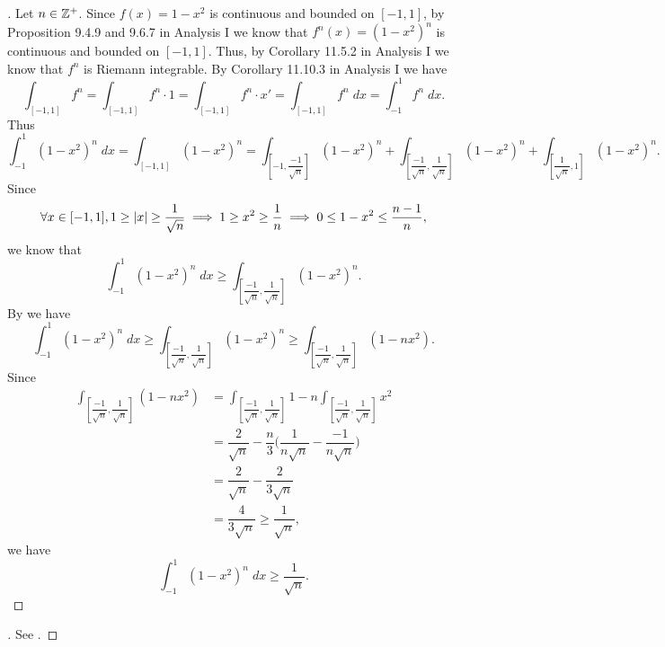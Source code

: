 \begin{proof}[]
  Let \(n \in \mathbb{Z}^+\).
  Since \(f(x) = 1 - x^2\) is continuous and bounded on \([-1, 1]\), by Proposition 9.4.9 and 9.6.7 in Analysis I we know that \(f^n(x) = (1 - x^2)^n\) is continuous and bounded on \([-1, 1]\).
  Thus, by Corollary 11.5.2 in Analysis I we know that \(f^n\) is Riemann integrable.
  By Corollary 11.10.3 in Analysis I we have
  \[
    \int_{[-1, 1]} f^n = \int_{[-1, 1]} f^n \cdot 1 = \int_{[-1, 1]} f^n \cdot x' = \int_{[-1, 1]} f^n \; dx = \int_{-1}^1 f^n \; dx.
  \]
  Thus
  \[
    \int_{-1}^1 (1 - x^2)^n \; dx = \int_{[-1, 1]} (1 - x^2)^n = \int_{[-1, \dfrac{-1}{\sqrt{n}}]} (1 - x^2)^n + \int_{[\dfrac{-1}{\sqrt{n}}, \dfrac{1}{\sqrt{n}}]} (1 - x^2)^n + \int_{[\dfrac{1}{\sqrt{n}}, 1]} (1 - x^2)^n.
  \]
  Since
  \[
    \forall x \in [-1, 1], 1 \geq \left\lvert x\right\rvert \geq \dfrac{1}{\sqrt{n}} \implies 1 \geq x^2 \geq \dfrac{1}{n} \implies 0 \leq 1 - x^2 \leq \dfrac{n - 1}{n},
  \]
  we know that
  \[
    \int_{-1}^1 (1 - x^2)^n \; dx \geq \int_{[\dfrac{-1}{\sqrt{n}}, \dfrac{1}{\sqrt{n}}]} (1 - x^2)^n.
  \]
  By  we have
  \[
    \int_{-1}^1 (1 - x^2)^n \; dx \geq \int_{[\dfrac{-1}{\sqrt{n}}, \dfrac{1}{\sqrt{n}}]} (1 - x^2)^n \geq \int_{[\dfrac{-1}{\sqrt{n}}, \dfrac{1}{\sqrt{n}}]} (1 - n x^2).
  \]
  Since
  \begin{align*}
    \int_{[\dfrac{-1}{\sqrt{n}}, \dfrac{1}{\sqrt{n}}]} (1 - n x^2) & = \int_{[\dfrac{-1}{\sqrt{n}}, \dfrac{1}{\sqrt{n}}]} 1 - n \int_{[\dfrac{-1}{\sqrt{n}}, \dfrac{1}{\sqrt{n}}]} x^2 \\
                                                                   & = \dfrac{2}{\sqrt{n}} - \dfrac{n}{3} \bigg(\dfrac{1}{n \sqrt{n}} - \dfrac{-1}{n \sqrt{n}}\bigg)                   \\
                                                                   & = \dfrac{2}{\sqrt{n}} - \dfrac{2}{3 \sqrt{n}}                                                                     \\
                                                                   & = \dfrac{4}{3 \sqrt{n}} \geq \dfrac{1}{\sqrt{n}},
  \end{align*}
  we have
  \[
    \int_{-1}^1 (1 - x^2)^n \; dx \geq \dfrac{1}{\sqrt{n}}.
  \]
\end{proof}

\begin{proof}[]
  See .
\end{proof}

